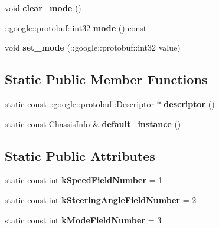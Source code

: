 \begin{DoxyCompactItemize}
\item 
\mbox{\label{classcontrol_data_1_1_chassis_info_ad0a825f8c7d8494f78e77c6e3121df3e}} 
void {\bfseries clear\+\_\+mode} ()
\item 
\mbox{\label{classcontrol_data_1_1_chassis_info_aad0e53be99b4c85341d9894c62a6f0ab}} 
\+::google\+::protobuf\+::int32 {\bfseries mode} () const
\item 
\mbox{\label{classcontrol_data_1_1_chassis_info_ab917ecb4c0936e6d06614596ad5d61d4}} 
void {\bfseries set\+\_\+mode} (\+::google\+::protobuf\+::int32 value)
\end{DoxyCompactItemize}
\subsection*{Static Public Member Functions}
\begin{DoxyCompactItemize}
\item 
\mbox{\label{classcontrol_data_1_1_chassis_info_a54e366b762b4da9b96366f1c173fb3e3}} 
static const \+::google\+::protobuf\+::\+Descriptor $\ast$ {\bfseries descriptor} ()
\item 
\mbox{\label{classcontrol_data_1_1_chassis_info_acfcaf5efc5278643d23a174c5e86fed9}} 
static const \hyperlink{classcontrol_data_1_1_chassis_info}{Chassis\+Info} \& {\bfseries default\+\_\+instance} ()
\end{DoxyCompactItemize}
\subsection*{Static Public Attributes}
\begin{DoxyCompactItemize}
\item 
\mbox{\label{classcontrol_data_1_1_chassis_info_a33fbc63b64b1c7f748396e4992b844ff}} 
static const int {\bfseries k\+Speed\+Field\+Number} = 1
\item 
\mbox{\label{classcontrol_data_1_1_chassis_info_ac9c3c62eb87c1c97ad28b8df7847b215}} 
static const int {\bfseries k\+Steering\+Angle\+Field\+Number} = 2
\item 
\mbox{\label{classcontrol_data_1_1_chassis_info_a1216f97c07c30715dbb41222e19176b9}} 
static const int {\bfseries k\+Mode\+Field\+Number} = 3
\end{DoxyCompactItemize}
